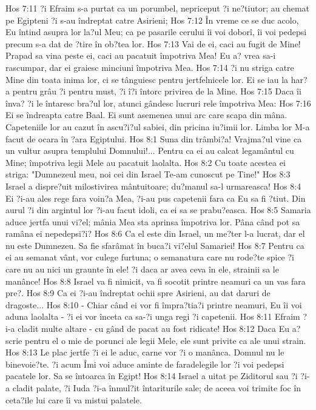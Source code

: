 Hos 7:11  ?i Efraim s-a purtat ca un porumbel, nepriceput ?i ne?tiutor; au chemat pe Egipteni ?i s-au îndreptat catre Asirieni;
Hos 7:12  În vreme ce se duc acolo, Eu întind asupra lor la?ul Meu; ca pe pasarile cerului îi voi doborî, îi voi pedepsi precum s-a dat de ?tire în ob?tea lor.
Hos 7:13  Vai de ei, caci au fugit de Mine! Prapad sa vina peste ei, caci au pacatuit împotriva Mea! Eu a? vrea sa-i rascumpar, dar ei graiesc minciuni împotriva Mea.
Hos 7:14  ?i nu striga catre Mine din toata inima lor, ci se tânguiesc pentru jertfelnicele lor. Ei se iau la har?a pentru grâu ?i pentru must, ?i î?i întorc privirea de la Mine.
Hos 7:15  Daca îi înva? ?i le întaresc bra?ul lor, atunci gândesc lucruri rele împotriva Mea:
Hos 7:16  Ei se îndreapta catre Baal. Ei sunt asemenea unui arc care scapa din mâna. Capeteniile lor au cazut în ascu?i?ul sabiei, din pricina iu?imii lor. Limba lor M-a facut de ocara în ?ara Egiptului.
Hos 8:1  Suna din trâmbi?a! Vrajma?ul vine ca un vultur asupra templului Domnului!... Pentru ca ei au calcat legamântul cu Mine; împotriva legii Mele au pacatuit laolalta.
Hos 8:2  Cu toate acestea ei striga: "Dumnezeul meu, noi cei din Israel Te-am cunoscut pe Tine!"
Hos 8:3  Israel a dispre?uit milostivirea mântuitoare; du?manul sa-l urmareasca!
Hos 8:4  Ei ?i-au ales rege fara voin?a Mea, ?i-au pus capetenii fara ca Eu sa fi ?tiut. Din aurul ?i din argintul lor ?i-au facut idoli, ca ei sa se prabu?easca.
Hos 8:5  Samaria aduce jertfa unui vi?el; mânia Mea sta aprinsa împotriva lor. Pâna când pot sa ramâna ei nepedepsi?i?
Hos 8:6  Ca el este din Israel, un me?ter l-a lucrat, dar el nu este Dumnezeu. Sa fie sfarâmat în buca?i vi?elul Samariei!
Hos 8:7  Pentru ca ei au semanat vânt, vor culege furtuna; o semanatura care nu rode?te spice ?i care nu au nici un graunte în ele! ?i daca ar avea ceva în ele, strainii sa le manânce!
Hos 8:8  Israel va fi nimicit, va fi socotit printre neamuri ca un vas fara pre?.
Hos 8:9  Ca ei ?i-au îndreptat ochii spre Asirieni, au dat daruri de dragoste...
Hos 8:10  - Chiar când ei vor fi împra?tia?i printre neamuri, Eu îi voi aduna laolalta - ?i ei vor înceta ca sa-?i unga regi ?i capetenii.
Hos 8:11  Efraim ?i-a cladit multe altare - cu gând de pacat au fost ridicate!
Hos 8:12  Daca Eu a? scrie pentru el o mie de porunci ale legii Mele, ele sunt privite ca ale unui strain.
Hos 8:13  Le plac jertfe ?i ei le aduc, carne vor ?i o manânca. Domnul nu le binevoie?te. ?i acum Îmi voi aduce aminte de faradelegile lor ?i voi pedepsi pacatele lor. Sa se întoarca în Egipt!
Hos 8:14  Israel a uitat pe Ziditorul sau ?i ?i-a cladit palate, ?i Iuda ?i-a înmul?it întariturile sale; de aceea voi trimite foc în ceta?ile lui care îi va mistui palatele.
